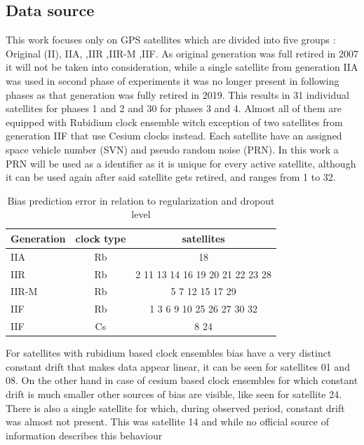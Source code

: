 \documentclass{kybernetika}
\begin{document}
\subsection{Data source}
This work focuses only on GPS satellites which are divided into five groups :
Original (II), IIA, ,IIR ,IIR-M ,IIF.
As original generation was full retired in 2007 it will not be taken into consideration, while
a single satellite from generation IIA was used in second phase of experiments it was no longer
present in following phases as that generation was fully retired in 2019.
This results in 31 individual satellites for phases 1 and 2 and 30 for phases 3 and 4.
Almost all of them are equipped with Rubidium clock ensemble witch exception of two satellites
from generation IIF that use Cesium clocks instead.
Each satellite have an assigned space vehicle number (SVN) and pseudo random noise (PRN).
In this work a PRN will be used as a identifier as it is unique for every active satellite, 
although it can be used again after said satellite gets retired, and ranges from 1 to 32.
\begin{table}[ht] \label{table:2}
\parindent0pt
\caption{Bias prediction error in relation to regularization and dropout level}
\centering
\begin{tabular}{ l  c  c }
  \hline
  \hline
  Generation& clock type& satellites\\  \hline
  IIA & Rb& 18\\  
  IIR & Rb& 2 11 13 14 16 19 20 21 22 23 28\\ 
  IIR-M & Rb& 5 7 12 15 17 29\\ 
  IIF & Rb& 1 3 6 9 10 25 26 27 30 32\\ 
  IIF & Cs& 8 24 \\ \hline \hline
 \end{tabular}
\end{table}
For satellites with rubidium based clock ensembles bias have a very distinct constant drift
that makes data appear linear, it can be seen for satellites 01 and 08. 
On the other hand in case of cesium based clock ensembles for which constant drift is much 
smaller other sources of bias are visible, like seen for satellite 24.
There is also a single satellite for which, during observed period, constant drift was almost
not present. This was satellite 14 and while no official source of information describes this 
behaviour
\end{document}
